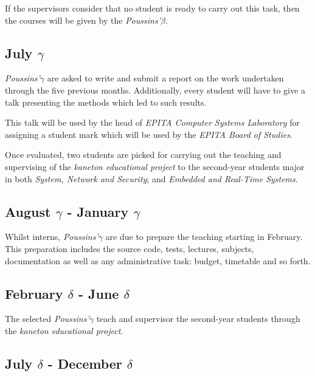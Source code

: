 \begin{multicols}{2}
If the supervisors consider that no student is ready to carry out this task,
then the courses will be given by the \textit{Poussins'$\beta$}.

%
%

\subsection{July $\gamma$}

\textit{Poussins'$\gamma$} are asked to write and submit a report on the
work undertaken through the five previous months. Additionally, every student
will have to give a talk presenting the methods which led to such results.

This talk will be used by the head of \textit{EPITA Computer Systems
Laboratory} for assigning a student mark which will be used by the
\textit{EPITA Board of Studies}.

Once evaluated, two students are picked for carrying out the teaching and
supervising of the \textit{kaneton educational project} to the second-year
students major in both \textit{System, Network and Security}; and
\textit{Embedded and Real-Time Systems}.

%
%

\subsection{August $\gamma$ - January $\gamma$}

Whilst interns, \textit{Poussins'$\gamma$} are due to prepare the teaching
starting in February. This preparation includes the source code, tests,
lectures, subjects, documentation as well as any administrative task: budget,
timetable and so forth.

%
%

\subsection{February $\delta$ - June $\delta$}

The selected \textit{Poussins'$\gamma$} teach and supervisor the second-year
students through the \textit{kaneton educational project}.

%
%

\subsection{July $\delta$ - December $\delta$}


\end{multicols}
